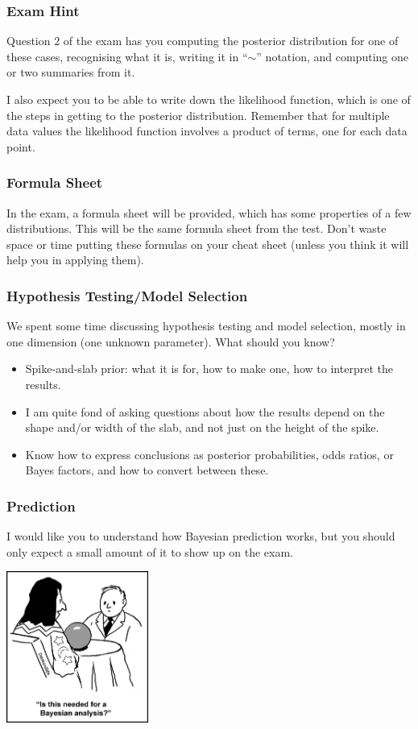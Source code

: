 \documentclass{beamer}
\begin{document}
\begin{frame}
\frametitle{Exam Hint}
Question 2 of the exam has you computing the posterior distribution for one
of these cases, recognising what it is, writing it in ``$\sim$'' notation,
and computing one or two summaries from it.\\[0.5em]\pause

I also expect you to be able to write down the likelihood function, which
is one of the steps in getting to the posterior distribution. Remember that
for multiple data values the likelihood function involves a product of terms,
one for each data point.

\end{frame}


\begin{frame}
\frametitle{Formula Sheet}
In the exam, a formula sheet will be provided, which has some properties of
a few distributions. This will be the same formula sheet from the test.
Don't waste space or time putting these formulas on your cheat sheet (unless
you think it will help you in applying them).

\end{frame}


\begin{frame}
\frametitle{Hypothesis Testing/Model Selection}
We spent some time discussing hypothesis testing and model selection,
mostly in one dimension (one unknown parameter). What should you know?\pause

\begin{itemize}
\item Spike-and-slab prior: what it is for, how to make one, how to interpret
the results.\pause
\item I am quite fond of asking questions about how the results depend on the
shape and/or width of the slab, and not just on the height of the spike.\pause
\item Know how to express conclusions as posterior probabilities, odds ratios,
or Bayes factors, and how to convert between these.
\end{itemize}


\end{frame}


\begin{frame}
\frametitle{Prediction}
I would like you to understand how Bayesian prediction works, but you should
only expect a small amount of it to show up on the exam.

\centering
\includegraphics[width=0.35\textwidth]{images/crystal_ball.jpg}

\end{frame}
\end{document}
